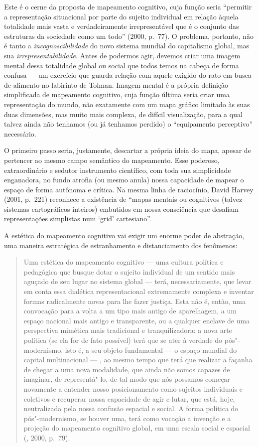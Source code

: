 Este é o cerne da proposta de mapeamento cognitivo, cuja função seria
``permitir a representação situacional por parte do sujeito individual
em relação àquela totalidade mais vasta e verdadeiramente
irrepresentável que é o conjunto das estruturas da sociedade como um
todo'' (2000, p.~77). O problema, portanto, não é tanto a
\emph{incognoscibilidade} do novo sistema mundial do capitalismo global,
mas sua \emph{irrepresentabilidade}. Antes de podermos agir, devemos criar uma
imagem mental dessa totalidade global ou social que todos temos na
cabeça de forma confusa --- um exercício que guarda relação com aquele
exigido do rato em busca de alimento no labirinto de Tolman. Imagem
mental é a própria definição simplificada de mapeamento cognitivo, cuja
função última seria criar uma representação do mundo, não exatamente com um mapa gráfico limitado às suas duas dimensões, mas muito mais complexa, de difícil visualização, para a qual talvez ainda não tenhamos (ou já tenhamos perdido) o ``equipamento perceptivo'' necessário.


O primeiro passo seria, justamente, descartar a própria ideia do mapa,
apesar de pertencer ao mesmo campo semântico do mapeamento.
Esse poderoso, extraordinário e sedutor instrumento científico, com toda
sua simplicidade enganadora, no fundo atrofia (ou mesmo anula) nossa
capacidade de mapear o espaço de forma autônoma e crítica. Na mesma
linha de raciocínio, David Harvey (2001, p.~221) reconhece a existência
de ``mapas mentais ou cognitivos (talvez sistemas cartográficos
inteiros) embutidos em nossa consciência que desafiam representações
simplistas num `grid' cartesiano''.

A estética do mapeamento cognitivo vai exigir um enorme poder de
abstração, uma maneira estratégica de estranhamento e distanciamento dos
fenômenos:

\begin{quote}
Uma estética do mapeamento cognitivo --- uma cultura política e
pedagógica que busque dotar o sujeito individual de um sentido mais
aguçado de seu lugar no sistema global --- terá, necessariamente, que
levar em conta essa dialética representacional extremamente complexa e
inventar formas radicalmente novas para lhe fazer justiça. Esta não é,
então, uma convocação para a volta a um tipo mais antigo de aparelhagem,
a um espaço nacional mais antigo e transparente, ou a qualquer enclave
de uma perspectiva mimética mais tradicional e tranquilizadora: a nova
arte política (se ela for de fato possível) terá que se ater à verdade
do pós"-modernismo, isto é, a seu objeto fundamental --- o espaço mundial
do capital multinacional --- , ao mesmo tempo que terá que realizar a
façanha de chegar a uma nova modalidade, que ainda não somos capazes de
imaginar, de representá"-lo, de tal modo que nós possamos começar
novamente a entender nosso posicionamento como sujeitos individuais e
coletivos e recuperar nossa capacidade de agir e lutar, que está, hoje,
neutralizada pela nossa confusão espacial e social. A forma política do
pós"-modernismo, se houver uma, terá como vocação a invenção e a projeção
do mapeamento cognitivo global, em uma escala social e espacial
(, 2000, p.~79).
\end{quote}


